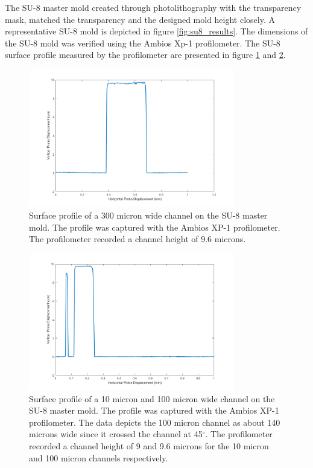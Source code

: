 \par The SU-8 master mold created through photolithography with the transparency mask, matched the transparency and the designed mold height closely. A representative SU-8 mold is depicted in figure \ref{fig:su8_results}. The dimensions of the SU-8 mold was verified using the Ambios Xp-1 profilometer. The SU-8 surface profile measured by the profilometer are presented in figure \ref{fig:profilometer_300um_channel} and \ref{fig:profilometer_10um_channel_100um_sideways}. 


\begin{figure}[H]
    \centering
    \includegraphics[width=0.8\textwidth]{images/300umWideChannel.png}
    \caption[Surface profile of a 300 micron wide channel on the SU-8 master mold.]{Surface profile of a 300 micron wide channel on the SU-8 master mold. The profile was captured with the Ambios XP-1 profilometer. The profilometer recorded a channel height of 9.6 microns.}
    \label{fig:profilometer_300um_channel}
\end{figure}

\begin{figure}[h]
    \centering
    \includegraphics[width=0.8\textwidth]{images/10umWideAndSidewaysThrough100umWide.png}
    \caption[Surface profile of a 10 micron and 100 micron wide channel on the SU-8 master mold.]{Surface profile of a 10 micron and 100 micron wide channel on the SU-8 master mold. The profile was captured with the Ambios XP-1 profilometer. The data depicts the 100 micron channel as about 140 microns wide since it crossed the channel at 45$^\circ$. The profilometer recorded a channel height of 9 and 9.6 microns for the 10 micron and 100 micron channels respectively.}
    \label{fig:profilometer_10um_channel_100um_sideways}
\end{figure}

